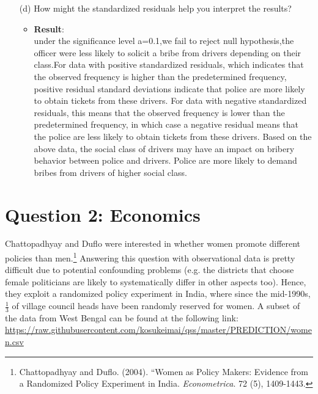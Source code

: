\documentclass[12pt,letterpaper]{article}
\begin{document}
\begin{enumerate}
	
	\vspace{1cm}
	\item [(d)] How might the standardized residuals help you interpret the results?  
	\begin{itemize}
	\item \textbf{Result}:\\
	under the significance level a=0.1,we fail to reject null hypothesis,the officer were less likely to solicit a bribe from drivers depending on their class.For data with positive standardized residuals, which indicates that the observed frequency is higher than the predetermined frequency, positive residual standard deviations indicate that police are more likely to obtain tickets from these drivers. For data with negative standardized residuals, this means that the observed frequency is lower than the predetermined frequency, in which case a negative residual means that the police are less likely to obtain tickets from these drivers. Based on the above data, the social class of drivers may have an impact on bribery behavior between police and drivers. Police are more likely to demand bribes from drivers of higher social class.
   \end{itemize}
	
\end{enumerate}
\newpage

\section*{Question 2: Economics}
Chattopadhyay and Duflo were interested in whether women promote different policies than men.\footnote{Chattopadhyay and Duflo. (2004). ``Women as Policy Makers: Evidence from a Randomized Policy Experiment in India. \textit{Econometrica}. 72 (5), 1409-1443.} Answering this question with observational data is pretty difficult due to potential confounding problems (e.g. the districts that choose female politicians are likely to systematically differ in other aspects too). Hence, they exploit a randomized policy experiment in India, where since the mid-1990s, $\frac{1}{3}$ of village council heads have been randomly reserved for women. A subset of the data from West Bengal can be found at the following link: \url{https://raw.githubusercontent.com/kosukeimai/qss/master/PREDICTION/women.csv}\\
\end{document}
